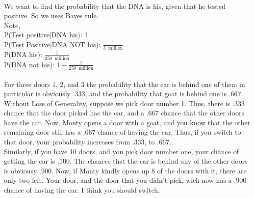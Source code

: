 \documentclass[letterpaper,12pt]{article}
\theoremstyle{definition}
\begin{document}
\\
We want to find the probability that the DNA is his, given that he tested positive. So we uses Bayes rule.\\
Note,\\
P(Test positive$|$DNA his): 1\\
P(Test Positive$|$DNA NOT his): $\frac{1}{3~\text{ million}}$\\
P(DNA his): $\frac{1}{250~\text{ million}}$\\
P(DNA not his): $1 - \frac{1}{250~\text{ million}}$\\


\\

For three doors 1, 2, and 3 the probability that the car is behind one of them in particular is obviously $.333$, 
and the probability that goat is behind one is $.667$. Without Loss of Generality, suppose we pick door number 1. 
Thus, there is $.333$ chance that the door picked has the car, and a $.667$ chance that the other doors have the car.
Now, Monty opens a door with a goat, and you know that the other remaining door still has a $.667$ chance of having the car.
Thus, if you switch to that door, your probability increases from $.333$, to $.667$.\\

Similarly, if you have 10 doors, and you pick door number one, your chance of getting the car is $.100$, 
The chances that the car is behind any of the other doors is obviousy $.900$. Now, if Monty kindly opens up 8 of the doors with it, there are only two left. Your door, and the door that you didn't pick, wich now has a $.900$ chance of having the car. I think you should switch.
\end{document}
